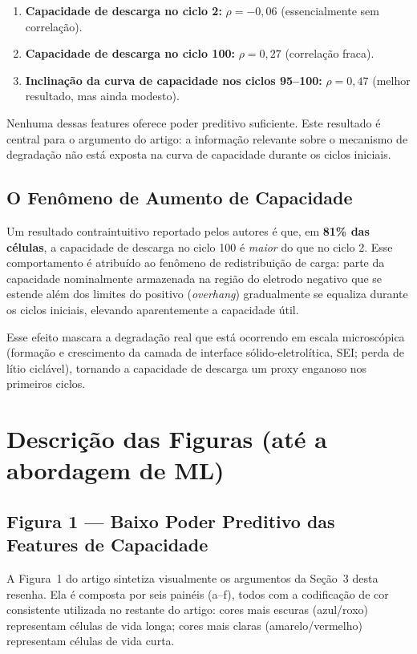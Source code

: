 \documentclass[12pt, a4paper]{article}
\begin{document}
\begin{enumerate}
  \item \textbf{Capacidade de descarga no ciclo 2:} $\rho = -0{,}06$
  (essencialmente sem correlação).
  \item \textbf{Capacidade de descarga no ciclo 100:} $\rho = 0{,}27$
  (correlação fraca).
  \item \textbf{Inclinação da curva de capacidade nos ciclos 95--100:}
  $\rho = 0{,}47$ (melhor resultado, mas ainda modesto).
\end{enumerate}

Nenhuma dessas features oferece poder preditivo suficiente. Este resultado
é central para o argumento do artigo: a informação relevante sobre o
mecanismo de degradação não está exposta na curva de capacidade durante os
ciclos iniciais.

\subsection{O Fenômeno de Aumento de Capacidade}

Um resultado contraintuitivo reportado pelos autores é que, em
\textbf{81\% das células}, a capacidade de descarga no ciclo 100 é
\emph{maior} do que no ciclo 2. Esse comportamento é atribuído ao fenômeno
de redistribuição de carga: parte da capacidade nominalmente armazenada na
região do eletrodo negativo que se estende além dos limites do positivo
(\textit{overhang}) gradualmente se equaliza durante os ciclos iniciais,
elevando aparentemente a capacidade útil.

Esse efeito mascara a degradação real que está ocorrendo em escala
microscópica (formação e crescimento da camada de interface sólido-eletrolítica,
SEI; perda de lítio ciclável), tornando a capacidade de descarga um proxy
enganoso nos primeiros ciclos.

\section{Descrição das Figuras (até a abordagem de ML)}

\subsection{Figura 1 --- Baixo Poder Preditivo das Features de Capacidade}

A Figura~1 do artigo sintetiza visualmente os argumentos da Seção~3 desta
resenha. Ela é composta por seis painéis (a--f), todos com a codificação de
cor consistente utilizada no restante do artigo: cores mais escuras
(azul/roxo) representam células de vida longa; cores mais claras
(amarelo/vermelho) representam células de vida curta.
\end{document}
